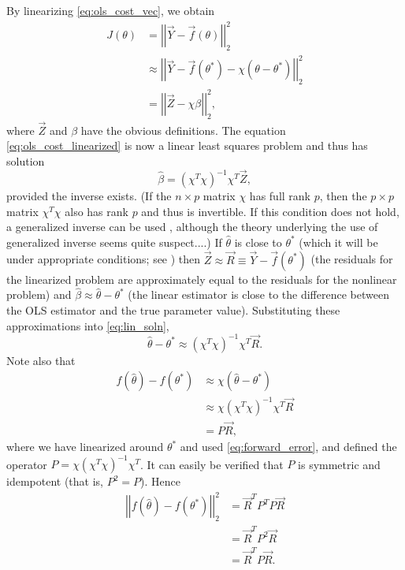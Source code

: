 \documentclass[10pt]{article}
\newcommand{\vecnorm}[1]{\left|\left|#1\right|\right|}
\begin{document}
By linearizing \eqref{eq:ols_cost_vec}, we obtain
\begin{align}
J(\theta) & = \vecnorm{\vec{Y} - \vec{f}(\theta)}_{2}^{2}\nonumber\\
	& \approx \vecnorm{\vec{Y} - \vec{f}(\theta^{*}) - \chi(\theta - \theta^{*})}_{2}^{2}\nonumber\\
	& = \vecnorm{\vec{Z} - \chi\beta}_{2}^{2},\label{eq:ols_cost_linearized}
\end{align}
where $\vec{Z}$ and $\beta$ have the obvious definitions.  The equation \eqref{eq:ols_cost_linearized} is now a linear least squares problem and thus has solution
\begin{equation}\label{eq:lin_soln}
\hat{\beta} = \left(\chi^{T}\chi\right)^{-1}\chi^{T}\vec{Z},
\end{equation}
provided the inverse exists.  (If the $n \times p$ matrix $\chi$ has full rank $p$, then the $p \times p$ matrix $\chi^{T}\chi$ also has rank $p$ and thus is invertible.  If this condition does not hold, a generalized inverse can be used \cite[Appendix D1.5]{SeberWild}, although the theory underlying the use of generalized inverse seems quite suspect....)  If $\hat{\theta}$ is close to $\theta^{*}$ (which it will be under appropriate conditions; see \cite{BanksFitzpatrick,Gallant,Jennrich1969,SeberWild}) then $\vec{Z} \approx \vec{R} \equiv \vec{Y} - \vec{f}(\theta^{*})$ (the residuals for the linearized problem are approximately equal to the residuals for the nonlinear problem) and $\hat{\beta} \approx \hat{\theta} - \theta^{*}$ (the linear estimator is close to the difference between the OLS estimator and the true parameter value).  Substituting these approximations into \eqref{eq:lin_soln},
\begin{equation}\label{eq:forward_error}
\hat{\theta} - \theta^{*} \approx (\chi^{T}\chi)^{-1}\chi^{T}\vec{R}.
\end{equation}
Note also that
\begin{align}
f(\hat{\theta}) - f(\theta^{*}) & \approx \chi(\hat{\theta} - \theta^{*})\nonumber\\
	& \approx \chi(\chi^{T}\chi)^{-1}\chi^{T}\vec{R}\nonumber\\
	& = P\vec{R},\label{eq:f_lin}
\end{align}
where we have linearized around $\theta^{*}$ and used \eqref{eq:forward_error}, and defined the operator $P = \chi(\chi^{T}\chi)^{-1}\chi^{T}$.  It can easily be verified that $P$ is symmetric and idempotent (that is, $P^{2} = P$).  Hence
\begin{align}
\vecnorm{f(\hat{\theta}) - f(\theta^{*})}_{2}^{2} & = \vec{R}^{T} P^{T} P \vec{R}\nonumber\\
	& = \vec{R}^{T} P^{2} \vec{R}\nonumber\\
	& = \vec{R}^{T} P \vec{R}.\label{eq:f_diff1}
\end{align}
\end{document}
